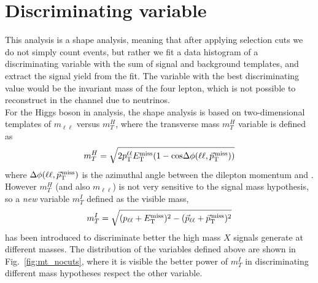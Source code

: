 \section{Discriminating variable}
This analysis is a shape analysis, meaning that after
applying selection cuts we do not simply count events, but rather we fit a data histogram of a
discriminating variable with the sum of signal and background templates, and
extract the signal yield from the fit.
The variable with the best discriminating value would be the invariant mass of
the four lepton, which is not possible to reconstruct in the \WW channel due
to neutrinos.\\
For the Higgs boson in \WW analysis, the shape analysis is based on two-dimensional templates of $m_{\ell \ell}$ versus $m_T^H$, where  the transverse mass  $m_T^H$ variable is defined as  
\begin{equation}
 m_T^H = \sqrt{2p_{\rm T}^{\ell\ell}E_{\mathrm{T}}^{\text{miss}}(1-\mathrm{cos}\Delta\phi(\ell\ell, {\vec p}_{\mathrm{T}}^{\kern1pt\text{miss}}))}
\end{equation}
where $\Delta\phi(\ell\ell, {\vec p}_{\mathrm{T}}^{\kern1pt\text{miss}})$ is the azimuthal angle between the dilepton momentum and \ptvecmiss.\\
However  $m_T^H$ (and also $m_{\ell \ell}$) is not very sensitive to the
signal mass hypothesis, so a \textit{new} variable $m_T^I$ defined as the visible mass,
\begin{equation}
 m_T^I = \sqrt{ (p_\mathrm{\ell\ell} + E_{\mathrm{T}}^{\text{miss}})^2 - (\vec{p}_\mathrm{\ell\ell} + {\vec p}_{\mathrm{T}}^{\kern1pt\text{miss}})^2 }
\end{equation}
has been introduced  to discriminate better the high mass $X$ signals generate at different masses.
The distribution of the variables defined above are shown in
Fig.~\ref{fig:mt_nocuts}, where it is visible the better power of $m_T^I$ in discriminating
different mass hypotheses respect the other variable.

